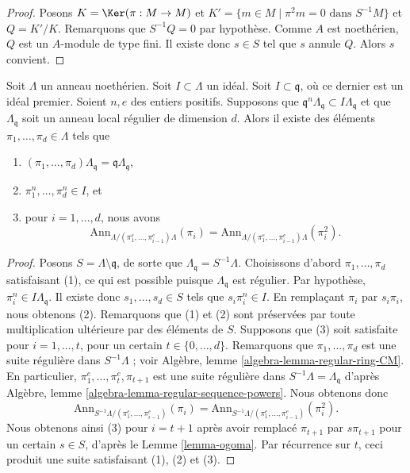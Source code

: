 \begin{proof}
Posons $K = \Ker(\pi : M \to M)$ et
$K' = \{m \in M \mid \pi^2 m = 0\text{ dans }S^{-1}M\}$ et
$Q = K'/K$. Remarquons que $S^{-1}Q = 0$ par hypothèse. Comme $A$
est noethérien, $Q$ est un $A$-module de type fini.
Il existe donc $s \in S$ tel que $s$ annule $Q$.
Alors $s$ convient.
\end{proof}

\begin{lemma}
\label{lemma-find-sequence}
Soit $\Lambda$ un anneau noethérien. Soit $I \subset \Lambda$ un idéal.
Soit $I \subset \mathfrak q$, où ce dernier est un idéal premier. Soient $n, e$ des entiers positifs.
Supposons que $\mathfrak q^n\Lambda_\mathfrak q \subset I\Lambda_\mathfrak q$
et que $\Lambda_\mathfrak q$ soit un anneau local régulier de dimension $d$.
Alors il existe des éléments $\pi_1, \ldots, \pi_d \in \Lambda$ tels que
\begin{enumerate}
\item $(\pi_1, \ldots, \pi_d)\Lambda_\mathfrak q =
\mathfrak q\Lambda_\mathfrak q$,
\item $\pi_1^n, \ldots, \pi_d^n \in I$, et
\item pour $i = 1, \ldots, d$, nous avons
$$
\text{Ann}_{\Lambda/(\pi_1^e, \ldots, \pi_{i - 1}^e)\Lambda}(\pi_i) =
\text{Ann}_{\Lambda/(\pi_1^e, \ldots, \pi_{i - 1}^e)\Lambda}(\pi_i^2).
$$
\end{enumerate}
\end{lemma}

\begin{proof}
Posons $S = \Lambda \setminus \mathfrak q$, de sorte que
$\Lambda_\mathfrak q = S^{-1}\Lambda$.
Choisissons d'abord $\pi_1, \ldots, \pi_d$ satisfaisant (1), ce qui est possible
puisque $\Lambda_\mathfrak q$ est régulier. Par hypothèse,
$\pi_i^n \in I\Lambda_\mathfrak q$. Il existe donc
$s_1, \ldots, s_d \in S$ tels que $s_i\pi_i^n \in I$.
En remplaçant $\pi_i$ par $s_i\pi_i$, nous obtenons (2).
Remarquons que (1) et (2) sont préservées par toute multiplication ultérieure par des éléments de $S$.
Supposons que (3) soit satisfaite pour $i = 1, \ldots, t$, pour un certain
$t \in \{0, \ldots, d\}$. Remarquons que
$\pi_1, \ldots, \pi_d$ est une suite régulière dans $S^{-1}\Lambda$ ; voir
Algèbre, lemme \ref{algebra-lemma-regular-ring-CM}.
En particulier, $\pi_1^e, \ldots, \pi_t^e, \pi_{t + 1}$ est une
suite régulière dans $S^{-1}\Lambda = \Lambda_\mathfrak q$ d'après
Algèbre, lemme \ref{algebra-lemma-regular-sequence-powers}.
Nous obtenons donc
$$
\text{Ann}_{S^{-1}\Lambda/(\pi_1^e, \ldots, \pi_{i - 1}^e)}(\pi_i) =
\text{Ann}_{S^{-1}\Lambda/(\pi_1^e, \ldots, \pi_{i - 1}^e)}(\pi_i^2).
$$
Nous obtenons ainsi (3) pour $i = t + 1$ après avoir remplacé $\pi_{t + 1}$ par $s\pi_{t + 1}$
pour un certain $s \in S$, d'après le Lemme \ref{lemma-ogoma}. Par récurrence sur $t$, ceci
produit une suite satisfaisant (1), (2) et (3).
\end{proof}

